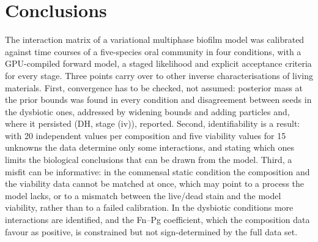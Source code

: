 \documentclass[preprint,12pt]{elsarticle}
\begin{document}
\section{Conclusions}
\label{sec:conclusions}

The interaction matrix of a variational multiphase biofilm model was calibrated against time courses of a five-species oral community in four conditions, with a GPU-compiled forward model, a staged likelihood and explicit acceptance criteria for every stage.
Three points carry over to other inverse characterisations of living materials.
First, convergence has to be checked, not assumed: posterior mass at the prior bounds was found in every condition and disagreement between seeds in the dysbiotic ones, addressed by widening bounds and adding particles and, where it persisted (DH, stage (iv)), reported.
Second, identifiability is a result: with 20 independent values per composition and five viability values for 15 unknowns the data determine only some interactions, and stating which ones limits the biological conclusions that can be drawn from the model.
Third, a misfit can be informative: in the commensal static condition the composition and the viability data cannot be matched at once, which may point to a process the model lacks, or to a mismatch between the live/dead stain and the model viability, rather than to a failed calibration.
In the dysbiotic conditions more interactions are identified, and the Fn--Pg coefficient, which the composition data favour as positive, is constrained but not sign-determined by the full data set.
\end{document}
